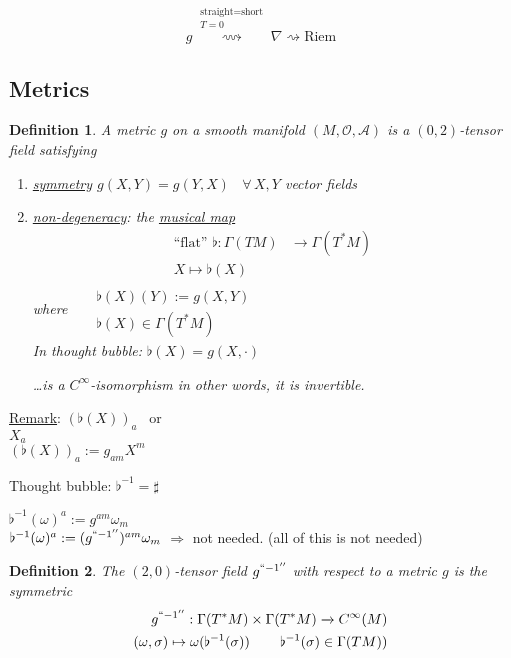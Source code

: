 \documentclass[10pt, twoside]{amsart}
\newtheorem{definition}{Definition}
\begin{document}
\begin{multicols*}{2}
\[
g  \overset{ \substack{ \text{straight} = \text{short} \\ T =0 }  }{ \rightsquigarrow }  \nabla \rightsquigarrow \text{Riem}
\]


\subsection{Metrics}

\begin{definition}
  A metric $g$ on a smooth manifold $(M,\mathcal{O}, \mathcal{A})$ is a $(0,2)$-tensor field satisfying
\begin{enumerate}
  \item[(i)] \underline{symmetry} $g(X,Y) = g(Y,X)$ \, $\forall \, X, Y$ vector fields
\item[(ii)] \underline{non-degeneracy}: the \underline{musical map} 
\[
\begin{aligned}
  \text{``flat''} \, \,  \flat : \Gamma(TM) & \to \Gamma(T^*M) \\ 
  X \mapsto \flat(X)
\end{aligned}
\]
\emph{where} \quad \,  $\begin{aligned} & \quad \quad \\ 
  & \flat(X)(Y):= g(X,Y) \\
  & \flat(X) \in \Gamma(T^*M) \end{aligned}$ \\
In thought bubble: $\flat(X) = g(X,\cdot)$

\dots is a $C^{\infty}$-isomorphism in other words, it is invertible.  


\end{enumerate}
\end{definition}

\underline{Remark}: $(\flat(X))_a$ \quad \, or \\
$X_a$ \\
$(\flat(X))_a := g_{am} X^m$

Thought bubble: $\flat^{-1} = \sharp$

$\flat^{-1}(\omega)^a := g^{am}\omega_m$ \\
$\flat^{-1}(\omega)^a := (g^{``-1''})^{am}\omega_m$
$\Longrightarrow $ not needed.  (all of this is not needed)

\begin{definition}
  The $(2,0)$-tensor field $g^{``-1''}$ with respect to a metric $g$ is the symmetric
\[
\begin{aligned}
  g^{``-1''} : \Gamma(T^*M) \times \Gamma(T^*M) \xrightarrow{ ~ } C^{\infty}(M) \\
  (\omega, \sigma) \mapsto \omega( \flat^{-1}(\sigma)) \quad \quad \, \flat^{-1}(\sigma) \in \Gamma(TM))
\end{aligned}
\]


\end{definition}
\end{multicols*}
\end{document}
